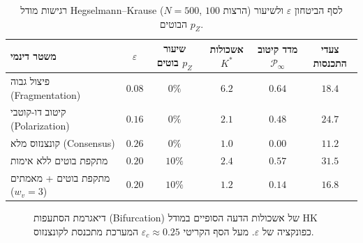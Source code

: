 \begin{table}[htbp]
\centering
\caption{רגישות מודל \textenglish{Hegselmann--Krause} ($N=500$, $100$ הרצות) לסף הביטחון $\varepsilon$ ולשיעור הבוטים $p_Z$.}
\label{tab:hk-regimes}
\begin{tabular}{@{}lccccc@{}}
\toprule
\textbf{משטר דינמי} & $\varepsilon$ & \textbf{שיעור בוטים $p_Z$} & \textbf{אשכולות $K^*$} & \textbf{מדד קיטוב $\mathcal{P}_\infty$} & \textbf{צעדי התכנסות} \\
\midrule
פיצול גבוה (\textenglish{Fragmentation}) & $0.08$ & $0\%$ & $6.2$ & $0.64$ & $18.4$ \\
קיטוב דו-קוטבי (\textenglish{Polarization}) & $0.16$ & $0\%$ & $2.1$ & $0.48$ & $24.7$ \\
קונצנזוס מלא (\textenglish{Consensus}) & $0.26$ & $0\%$ & $1.0$ & $0.00$ & $11.2$ \\
מתקפת בוטים ללא אימות & $0.20$ & $10\%$ & $2.4$ & $0.57$ & $31.5$ \\
מתקפת בוטים + מאמתים ($w_v=3$) & $0.20$ & $10\%$ & $1.2$ & $0.14$ & $16.8$ \\
\bottomrule
\end{tabular}
\end{table}

\begin{figure}[htbp]
\centering
\begin{english}
\end{english}
\caption{דיאגרמת הסתעפות (\textenglish{Bifurcation}) של אשכולות הדעה הסופיים במודל \textenglish{HK} כפונקציה של $\varepsilon$. מעל הסף הקריטי $\varepsilon_c \approx 0.25$ המערכת מתכנסת לקונצנזוס.}
\label{fig:hk-bifurcation}
\end{figure}

